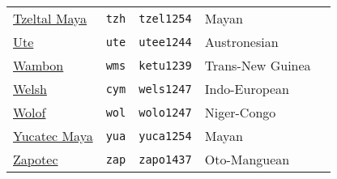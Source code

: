 \begin{longtable}[c]{ l l l l l }
  \href{https://glottolog.org/resource/languoid/id/tzel1254}{Tzeltal Maya}           & \texttt{tzh}       & \texttt{tzel1254}   & Mayan\\
  \href{https://glottolog.org/resource/languoid/id/utee1244}{Ute}                    & \texttt{ute}       & \texttt{utee1244}   & Austronesian\\
  \href{https://glottolog.org/resource/languoid/id/ketu1239}{Wambon}                 & \texttt{wms}       & \texttt{ketu1239}   & Trans-New Guinea\\
  \href{https://glottolog.org/resource/languoid/id/wels1247}{Welsh}                  & \texttt{cym}       & \texttt{wels1247}   & Indo-European\\
  \href{https://glottolog.org/resource/languoid/id/wolo1247}{Wolof}                  & \texttt{wol}       & \texttt{wolo1247}   & Niger-Congo\\
  \href{https://glottolog.org/resource/languoid/id/yuca1254}{Yucatec Maya}           & \texttt{yua}       & \texttt{yuca1254}   & Mayan\\
  \href{https://glottolog.org/resource/languoid/id/zapo1437}{Zapotec}                & \texttt{zap}       & \texttt{zapo1437}   & Oto-Manguean\\
\end{longtable}
